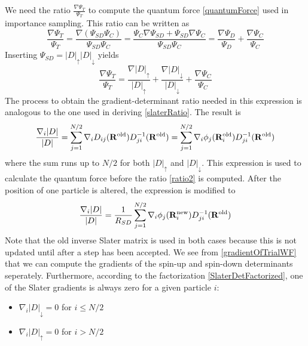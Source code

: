 \documentclass[english, a4paper]{article}
\begin{document}
We need the ratio $\frac{\nabla \Psi_T}{\Psi_T}$ to compute the quantum force \eqref{quantumForce}
used in importance sampling. This ratio can be written as
\begin{equation}
 \frac{\nabla \Psi_T}{\Psi_T} = \frac{\nabla (\Psi_{SD}\Psi_C)}{\Psi_{SD}\Psi_C} = 
 \frac{\Psi_{C}\nabla\Psi_{SD} + \Psi_{SD}\nabla\Psi_C}{\Psi_{SD}\Psi_C} = 
 \frac{\nabla \Psi_D}{\Psi_D} + \frac{\nabla \Psi_C}{\Psi_C}
\end{equation}
Inserting $\Psi_{SD} = |D|_\uparrow|D|_\downarrow$ yields
\begin{equation}
 \frac{\nabla \Psi_T}{\Psi_T} = \frac{\nabla|D|_\uparrow}{|D|_\uparrow} + 
 \frac{\nabla |D|_\downarrow}{|D|_\downarrow} + \frac{\nabla \Psi_C}{\Psi_C}
 \label{gradientOfTrialWF}
\end{equation}
The process to obtain the gradient-determinant ratio needed in this expression is analogous to
the one used in deriving \eqref{slaterRatio}. The result is
\begin{equation}
 \frac{\nabla_i |D|}{|D|} = \sum_{j=1}^{N/2} \nabla_i D_{ij}({\bf R}^{\textrm{old}}) D_{ji}^{-1}
 ({\bf R}^{\textrm{old}})
        = \sum_{j=1}^{N/2}\nabla_i \phi_j({\bf R}_i^{\textrm{old}}) D_{ji}^{-1}({\bf R}^{\textrm{old}})
        \label{gradientRatioBefore}
\end{equation}
where the sum runs up to $N/2$ for both $|D|_\uparrow$ and $|D|_\downarrow$. 
This expression is used to calculate the quantum force before the ratio \eqref{ratio2} is computed. 
After the position of one particle is altered, the expression is modified to
\begin{equation}
 \frac{\nabla_i |D|}{|D|}
        = \frac{1}{R_{SD}} \sum_{j=1}^{N/2} \nabla_i \phi_j({\bf R}_i^{\textrm{new}}) D_{ji}^{-1}({\bf R}^{\textrm{old}})
        \label{gradientRatioAfter}
\end{equation}
Note that the old inverse Slater matrix is used in both cases because this is not updated until after 
a step has been accepted. We see from \eqref{gradientOfTrialWF} that we can compute
the gradients of the spin-up and spin-down determinants seperately. Furthermore, according to 
the factorization \eqref{SlaterDetFactorized},
one of the Slater gradients is always zero for a given particle $i$:
\begin{itemize}
 \item $\nabla_i |D|_\downarrow = 0$  for $i \leq N/2$
 \item $\nabla_i |D|_\uparrow = 0$ for $i > N/2$
\end{itemize}
\end{document}
